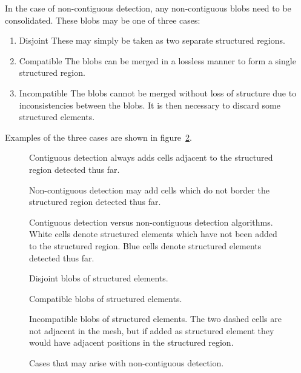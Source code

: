 In the case of non-contiguous detection, any non-contiguous blobs need to be consolidated. These blobs may be one of three cases:
\begin{enumerate}
\item Disjoint
These may simply be taken as two separate structured regions.

\item Compatible
The blobs can be merged in a lossless manner to form a single structured region.

\item Incompatible
The blobs cannot be merged without loss of structure due to inconsistencies between the blobs. It is then necessary to discard some structured elements.
\end{enumerate}

Examples of the three cases are shown in figure~\ref{fig:non-contiguous-detection}.


\begin{figure}

\sidebyside
{
	\drawmatrix[cell wd=0.6, cell ht=0.6]{\contiguousmatrix}
	\caption{Contiguous detection always adds cells adjacent to the structured region detected thus far.}
}
{
	\drawmatrix[cell wd=0.6, cell ht=0.6]{\noncontiguousmatrix}
	\caption{Non-contiguous detection may add cells which do not border the structured region detected thus far.}
}
\caption{Contiguous detection versus non-contiguous detection algorithms. White cells denote structured elements which have not been added to the structured region. Blue cells denote structured elements detected thus far.\label{fig:contiguous-detection}}
\end{figure}

\begin{figure}
\sidebysidethreeverticaltop
{
	
	\caption{Disjoint blobs of structured elements.}
}
{
	
	\caption{Compatible blobs of structured elements.}
}
{
	
	\caption{Incompatible blobs of structured elements. The two dashed cells are not adjacent in the mesh, but if added as structured element they would have adjacent positions in the structured region.}
}
\caption{Cases that may arise with non-contiguous detection.\label{fig:non-contiguous-detection}}
\end{figure}


